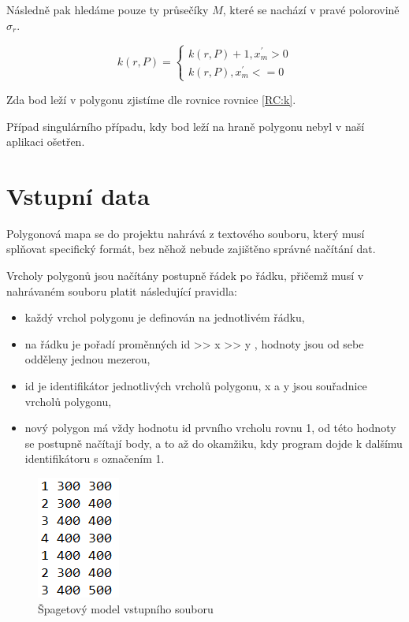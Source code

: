 \documentclass[11pt]{article}
\begin{document}
Následně pak hledáme pouze ty průsečíky $M$, které se nachází v pravé polorovině $\sigma_{r}$.

\begin{equation}
k(r, P)=\left\{\begin{array}{l}
k(r, P)+1, x_{m}^{\prime}>0 \\ 
k(r, P), x_{m}^{\prime} <= 0
\end{array}\right.
\end{equation}

Zda bod leží v polygonu zjistíme dle rovnice rovnice \ref{RC:k}.

Případ singulárního případu, kdy bod leží na hraně polygonu nebyl v naší aplikaci ošetřen.

\clearpage





\section{Vstupní data}

Polygonová mapa se do projektu nahrává z textového souboru, který musí splňovat specifický formát, bez něhož nebude zajištěno správné načítání dat.  

Vrcholy polygonů jsou načítány postupně řádek po řádku, přičemž musí v nahrávaném souboru platit následující pravidla:    

\begin{itemize}
\item každý vrchol polygonu je definován na jednotlivém řádku,
\item na řádku je pořadí proměnných id >> x >> y   ,  hodnoty jsou od sebe odděleny  jednou mezerou,
\item id je identifikátor jednotlivých vrcholů polygonu, x a y jsou souřadnice vrcholů polygonu,    
\item nový polygon má vždy hodnotu id prvního vrcholu rovnu 1, od této hodnoty  se  postupně načítají body, a  to až do okamžiku,  kdy program dojde  k dalšímu identifikátoru s označením 1.   
\end{itemize}

\begin{figure}[htbh]
	\centering
	\includegraphics[scale=1]{images/vstup.png} 
	\caption{Špagetový model vstupního souboru}
	\label{fig:vstup.}
\end{figure} 
\end{document}
